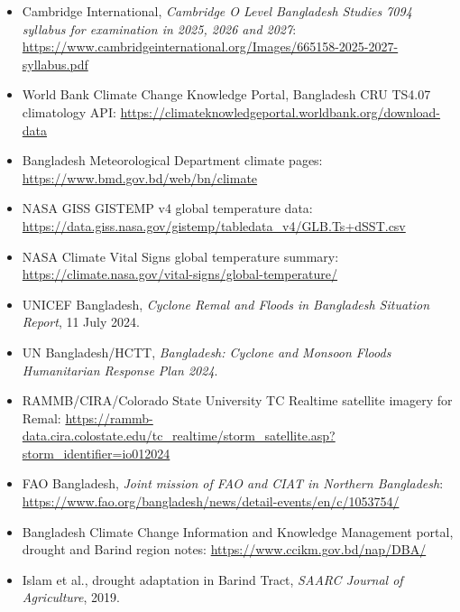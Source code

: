\documentclass[11pt,a4paper]{article}
\begin{document}
\begin{itemize}
  \item Cambridge International, \textit{Cambridge O Level Bangladesh Studies 7094 syllabus for examination in 2025, 2026 and 2027}: \url{https://www.cambridgeinternational.org/Images/665158-2025-2027-syllabus.pdf}
  \item World Bank Climate Change Knowledge Portal, Bangladesh CRU TS4.07 climatology API: \url{https://climateknowledgeportal.worldbank.org/download-data}
  \item Bangladesh Meteorological Department climate pages: \url{https://www.bmd.gov.bd/web/bn/climate}
  \item NASA GISS GISTEMP v4 global temperature data: \url{https://data.giss.nasa.gov/gistemp/tabledata_v4/GLB.Ts+dSST.csv}
  \item NASA Climate Vital Signs global temperature summary: \url{https://climate.nasa.gov/vital-signs/global-temperature/}
  \item UNICEF Bangladesh, \textit{Cyclone Remal and Floods in Bangladesh Situation Report}, 11 July 2024.
  \item UN Bangladesh/HCTT, \textit{Bangladesh: Cyclone and Monsoon Floods Humanitarian Response Plan 2024}.
  \item RAMMB/CIRA/Colorado State University TC Realtime satellite imagery for Remal: \url{https://rammb-data.cira.colostate.edu/tc_realtime/storm_satellite.asp?storm_identifier=io012024}
  \item FAO Bangladesh, \textit{Joint mission of FAO and CIAT in Northern Bangladesh}: \url{https://www.fao.org/bangladesh/news/detail-events/en/c/1053754/}
  \item Bangladesh Climate Change Information and Knowledge Management portal, drought and Barind region notes: \url{https://www.ccikm.gov.bd/nap/DBA/}
  \item Islam et al., drought adaptation in Barind Tract, \textit{SAARC Journal of Agriculture}, 2019.
\end{itemize}
\end{document}
